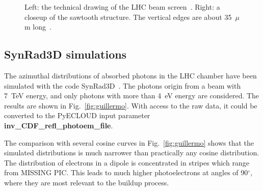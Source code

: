 \begin{figure}[tbh]
\begin{minipage}[c]{0.47\textwidth}
    \end{minipage}
\caption{
        Left: the technical drawing of the LHC beam screen~\cite{beam_screen_drawing}. Right: a closeup of the sawtooth structure. The vertical edges are about 35~$\mu$m long~\cite{zimmermann}.
        }
\label{fig:beam_screen_structure}
\end{figure}

\subsection{SynRad3D simulations}
The azimuthal distributions of absorbed photons in the LHC chamber have been simulated with the code SynRad3D~\cite{guillermo}.
The photons origin from a beam with 7~TeV energy, and only photons with more than 4~eV energy are considered.
The results are shown in Fig.~\ref{fig:guillermo}.
With access to the raw data, it could be converted to the PyECLOUD input parameter \textbf{inv\_CDF\_refl\_photoem\_file}.

The comparison with several cosine curves in Fig.~\ref{fig:guillermo} shows that the simulated distributions is much narrower than practically any cosine distribution.
The distribution of electrons in a dipole is concentrated in stripes which range from MISSING PIC.
This leads to much higher photoelectrons at angles of 90$^\circ$, where they are most relevant to the buildup process.

